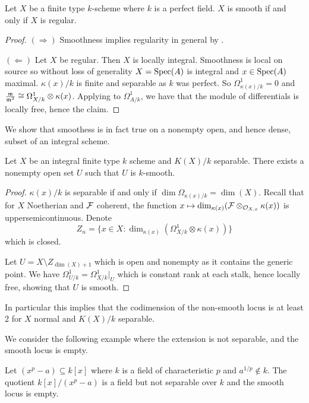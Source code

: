 \begin{corollary}
    Let $X$ be a finite type $k$-scheme where $k$ is a perfect field. $X$ is smooth if and only if $X$ is regular. 
\end{corollary}
\begin{proof}
    $(\Rightarrow)$ Smoothness implies regularity in general by . 

    $(\Leftarrow)$ Let $X$ be regular. Then $X$ is locally integral. Smoothness is local on source so without loss of generality $X=\operatorname{Spec}(A)$ is integral and $x\in\operatorname{Spec}(A)$ maximal. $\kappa(x)/k$ is finite and separable as $k$ was perfect. So $\Omega_{\kappa(x)/k}^{1}=0$ and $\frac{\mathfrak{m}}{\mathfrak{m}^{2}}\cong\Omega_{X/k}^{1}\otimes\kappa(x)$. Applying  to $\Omega_{A/k}^{1}$, we have that the module of differentials is locally free, hence the claim. 
\end{proof}
We show that smoothess is in fact true on a nonempty open, and hence dense, subset of an integral scheme. 
\begin{proposition}\label{prop: smooth on open}
    Let $X$ be an integral finite type $k$ scheme and $K(X)/k$ separable. There exists a nonempty open set $U$ such that $U$ is $k$-smooth. 
\end{proposition}
\begin{proof}
    $\kappa(x)/k$ is separable if and only if $\dim\Omega_{\kappa(x)/k}=\dim(X)$. Recall that for $X$ Noetherian and $\mathcal{F}$ coherent, the function $x\mapsto\dim_{\kappa(x)}(\mathcal{F}\otimes_{\mathcal{O}_{X,x}}\kappa(x))$ is uppersemicontinuous. Denote 
    $$Z_{n}=\{x\in X:\dim_{\kappa(x)}(\Omega_{X/k}^{1}\otimes\kappa(x))\}$$
    which is closed. 

    Let $U=X\setminus Z_{\dim(X)+1}$ which is open and nonempty as it contains the generic point. We have $\Omega^{1}_{U/k}=\Omega^{1}_{X/k}|_{U}$ which is constant rank at each stalk, hence locally free, showing that $U$ is smooth. 
\end{proof}
In particular this implies that the codimension of the non-smooth locus is at least 2 for $X$ normal and $K(X)/k$ separable. 

We consider the following example where the extension is not separable, and the smooth locus is empty. 
\begin{example}
    Let $(x^{p}-a)\subseteq k[x]$ where $k$ is a field of characteristic $p$ and $a^{1/p}\notin k$. The quotient $k[x]/(x^{p}-a)$ is a field but not separable over $k$ and the smooth locus is empty. 
\end{example}

